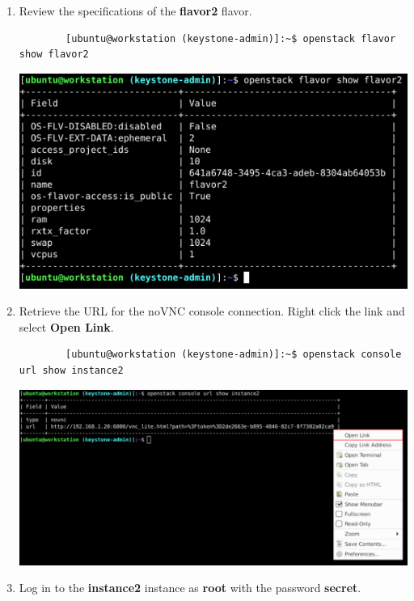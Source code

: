 \documentclass[letterpaper, 12pt]{article}
\begin{document}
\begin{enumerate}
    \item Review the specifications of the \textbf{flavor2} flavor.
    \begin{lstlisting}
        [ubuntu@workstation (keystone-admin)]:~$ openstack flavor show flavor2
    \end{lstlisting}

    \begin{center}
        \includegraphics[width=\linewidth]{images/part5/step4.png}
    \end{center}

    \item Retrieve the URL for the noVNC console connection. Right click the link and select \textbf{Open Link}.
    \begin{lstlisting}
        [ubuntu@workstation (keystone-admin)]:~$ openstack console url show instance2
    \end{lstlisting}

    \begin{center}
        \includegraphics[width=\linewidth]{images/part5/step5.png}
    \end{center}

    \item Log in to the \textbf{instance2} instance as \textbf{root} with the password \textbf{secret}.
    

\end{enumerate}
\end{document}
